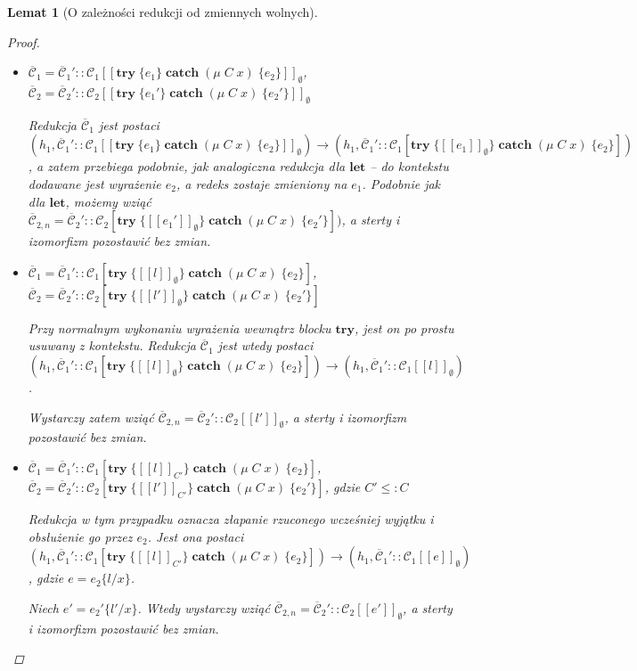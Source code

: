 \documentclass[]{pracamgr}
\renewcommand \| {\hspace{0.75em} | \hspace{0.75em} }
\renewcommand \[ {[\![}
\renewcommand \] {]\!]}
\newtheorem{lemma}{Lemat}
\theoremstyle{definition}
\newcommand{\mmod}{\mu\xspace}
\newcommand{\jlet}{\mathbf{let}\xspace}
\newcommand{\jthrow}{\mathbf{throw}\xspace}
\newcommand{\jtry}{\mathbf{try}\xspace}
\newcommand{\jcatch}{\mathbf{catch}\xspace}
\newcommand{\throwin}[1]{\jthrow\; #1\xspace}
\newcommand{\tcatch}[4]{\jtry\; \boldsymbol{\{}#1\boldsymbol{\}}\; \jcatch\; (#2\; #3)\; \boldsymbol{\{}#4\boldsymbol{\}}\xspace}
\newcommand{\ctxt}{\mathcal{C}\xspace}
\newcommand{\ctxts}{\overline{\ctxt}}
\newcommand{\classof}{\mathsf{class}\xspace}
\begin{document}
\begin{lemma}[O zależności redukcji od zmiennych wolnych]{\ }
\begin{proof}
\begin{itemize}
Redukcja $\ctxts_1$ jest postaci
 $(h_1, \ctxts_1'::\ctxt_1\[ \throwin{l}\]_\emptyset) \rightarrow
  (h_1, \ctxts_1'::\ctxt_1\[ l\]_{D})$, gdzie $\classof(h_1, l) = D$, zatem jedynym efektem
jest zmiana trybu wykonania na wyjątkowy z wartością wyjątku $l$ i typem $D$.
Możemy więc po prostu wziąć $\ctxts_{2, n} = \ctxts_2'::\ctxt_2\[ l'\]_{D}$,
a sterty i izomorfizm pozostawić bez zmian.

\item $\ctxts_1 = \ctxts_1'::\ctxt_1\[ \tcatch{e_1}{\mmod\; C}{x}{e_2}\]_\emptyset$, \;\;
      $\ctxts_2 = \ctxts_2'::\ctxt_2\[ \tcatch{e_1'}{\mmod\; C}{x}{e_2'}\]_\emptyset$

Redukcja $\ctxts_1$ jest postaci
$(h_1, \ctxts_1'::\ctxt_1\[ \tcatch{e_1}{\mmod\; C}{x}{e_2}\]_\emptyset) \rightarrow
 (h_1, \ctxts_1'::\ctxt_1[\tcatch{\[ e_1\] _\emptyset}{\mmod\; C}{x}{e_2}])$,
a zatem przebiega podobnie, jak analogiczna redukcja dla $\jlet$ -- do kontekstu dodawane jest
wyrażenie $e_2$, a redeks zostaje zmieniony na $e_1$. Podobnie jak dla $\jlet$, możemy wziąć
$\ctxts_{2, n} = \ctxts_2'::\ctxt_2[\tcatch{\[ e_1'\] _\emptyset}{\mmod\; C}{x}{e_2'}])$,
a sterty i izomorfizm pozostawić bez zmian.

\item $\ctxts_1 = \ctxts_1'::\ctxt_1[\tcatch{\[ l\] _\emptyset}{\mmod\; C}{x}{e_2}]$, \;\;
      $\ctxts_2 = \ctxts_2'::\ctxt_2[\tcatch{\[ l'\] _\emptyset}{\mmod\; C}{x}{e_2'}]$

Przy normalnym wykonaniu wyrażenia wewnątrz blocku $\jtry$, jest on po prostu usuwany z kontekstu.
Redukcja $\ctxts_1$ jest wtedy postaci
$(h_1, \ctxts_1'::\ctxt_1[\tcatch{\[ l\] _\emptyset}{\mmod\; C}{x}{e_2}]) \rightarrow
 (h_1, \ctxts_1'::\ctxt_1\[ l\]_\emptyset)$.
 
Wystarczy zatem wziąć $\ctxts_{2,n} = \ctxts_2'::\ctxt_2\[ l'\]_\emptyset$,
a sterty i izomorfizm pozostawić bez zmian.

\item $\ctxts_1 = \ctxts_1'::\ctxt_1[\tcatch{\[ l\] _{C'}}{\mmod\; C}{x}{e_2}]$, \;\;
      $\ctxts_2 = \ctxts_2'::\ctxt_2[\tcatch{\[ l'\] _{C'}}{\mmod\; C}{x}{e_2'}]$, \;\;
      gdzie $C' \leq:  C $
      
Redukcja w tym przypadku oznacza złapanie rzuconego wcześniej wyjątku i obsłużenie go przez $e_2$.
Jest ona postaci
$(h_1, \ctxts_1'::\ctxt_1[\tcatch{\[ l\] _{C'}}{\mmod\; C}{x}{e_2}]) \rightarrow
 (h_1, \ctxts_1'::\ctxt_1\[ e\]_\emptyset)$, gdzie $e = e_2\{l/x\}$.

Niech $e' = e_2'\{l' / x\}$. Wtedy wystarczy wziąć
$\ctxts_{2,n} = \ctxts_2'::\ctxt_2\[ e'\]_\emptyset$, a sterty i izomorfizm pozostawić bez zmian.


\end{itemize}
\end{proof}
\end{lemma}
\end{document}
